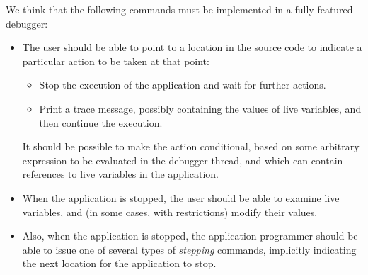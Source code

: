 We think that the following commands must be implemented in a fully
featured debugger:

\begin{itemize}
\item The user should be able to point to a location
  in the source code to indicate a particular action to be taken at
  that point:
  \begin{itemize}
  \item Stop the execution of the application and wait for further
    actions.
  \item Print a trace message, possibly containing the values of live
    variables, and then continue the execution. 
  \end{itemize}
  It should be possible to make the action conditional, based on some
  arbitrary expression to be evaluated in the debugger thread, and
  which can contain references to live variables in the application.
\item When the application is stopped, the user
  should be able to examine live variables, and (in some cases, with
  restrictions) modify their values.
\item Also, when the application is stopped, the application
  programmer should be able to issue one of several types of
  \emph{stepping} commands, implicitly indicating the next location
  for the application to stop.
\end{itemize}
